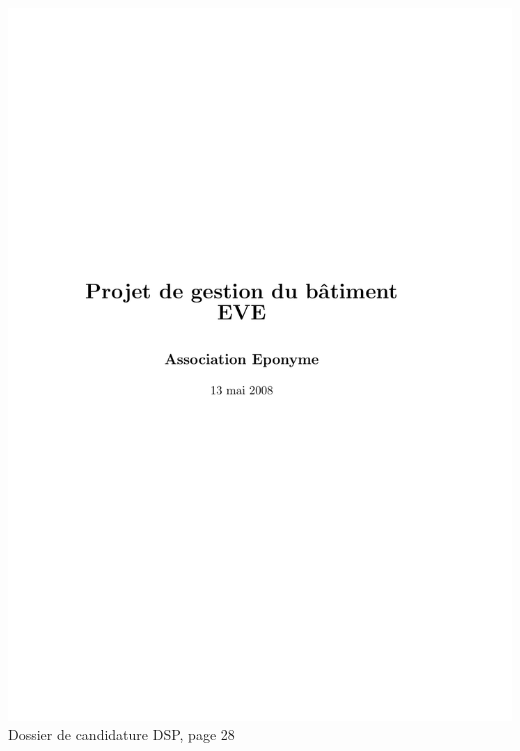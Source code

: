 \includegraphics[scale=0.85,trim=20mm 20mm 20mm 20mm,clip,page=28]{annexes/candidature_dsp.pdf} \\
Dossier de candidature DSP, page 28
\newpage
